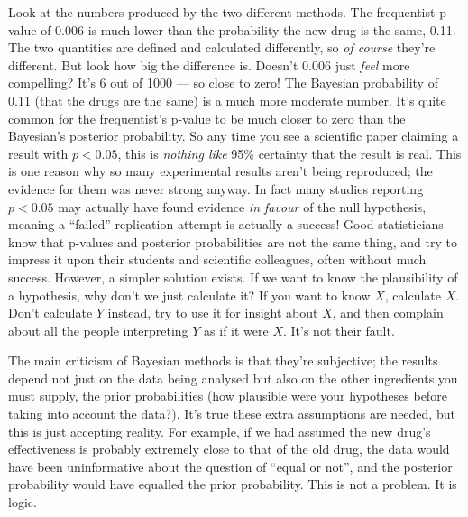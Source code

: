 \documentclass[a4paper, 12pt]{article}
\begin{document}
Look at the numbers produced by the two different methods. The frequentist p-value of 0.006 is much lower than the probability the new drug is the same, 0.11.
The two quantities are defined and calculated differently, so {\em of course} they're different. But look how big the difference is.
Doesn't 0.006 just {\em feel}
more compelling? It's 6 out of 1000 --- so close to zero!
The Bayesian probability of 0.11 (that the drugs are the same) is a much
more moderate number. It's quite common for the frequentist's p-value to
be much closer to zero than the Bayesian's posterior probability.
So any time you see a scientific paper claiming a result with $p < 0.05$, this
is {\em nothing like} 95\% certainty that the result is real. This is one
reason why so many experimental results aren't being reproduced; the evidence
for them was never strong anyway. In fact many studies reporting $p < 0.05$
may actually have found evidence {\em in favour} of the null hypothesis, meaning
a ``failed'' replication attempt is actually a success!
Good statisticians know that p-values and posterior probabilities are not the
same thing, and try to impress it upon their students and
scientific colleagues, often without much success.
However, a simpler solution exists. If we want to know
the plausibility of a hypothesis, why don't we just calculate it? If you want
to know $X$, calculate $X$. Don't calculate $Y$ instead, try to use it for
insight about $X$, and then complain
about all the people interpreting $Y$ as if it were $X$. It's not their fault.

The main criticism of Bayesian methods is that they're subjective; the results
depend not just on the data being analysed but also on the other ingredients
you must supply, the prior probabilities (how plausible were your hypotheses
before taking into account the data?). It's true these extra assumptions are
needed, but this is just accepting reality. For example, if we had assumed
the new drug's effectiveness is probably extremely close to that of the old drug,
the data would have been uninformative about the question of ``equal or not'',
and the posterior probability would have equalled the prior probability. This
is not a problem. It is logic.
\end{document}
